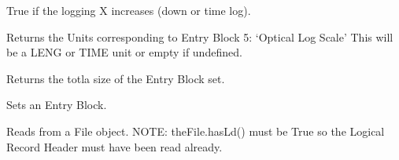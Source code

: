 \documentclass[letterpaper,10pt,english]{sphinxmanual}
\begin{document}
\begin{fulllineitems}
\begin{fulllineitems}
\end{fulllineitems}


\begin{fulllineitems}
\label{\detokenize{ref/LIS/core/LogiRec:TotalDepth.LIS.core.LogiRec.EntryBlockSet.xInc}}
True if the logging X increases (down or time log).

\end{fulllineitems}


\begin{fulllineitems}
\label{\detokenize{ref/LIS/core/LogiRec:TotalDepth.LIS.core.LogiRec.EntryBlockSet.opticalLogScale}}
Returns the Units corresponding to Entry Block 5: ‘Optical Log Scale’
This will be a LENG or TIME unit or empty if undefined.

\end{fulllineitems}


\begin{fulllineitems}
\label{\detokenize{ref/LIS/core/LogiRec:TotalDepth.LIS.core.LogiRec.EntryBlockSet.lisSize}}
Returns the totla size of the Entry Block set.

\end{fulllineitems}


\begin{fulllineitems}
\label{\detokenize{ref/LIS/core/LogiRec:TotalDepth.LIS.core.LogiRec.EntryBlockSet.setEntryBlock}}
Sets an Entry Block.

\end{fulllineitems}


\begin{fulllineitems}
\label{\detokenize{ref/LIS/core/LogiRec:TotalDepth.LIS.core.LogiRec.EntryBlockSet.readFromFile}}
Reads from a File object. NOTE: theFile.hasLd() must be True so
the Logical Record Header must have been read already.


\end{fulllineitems}
\end{fulllineitems}
\end{document}
